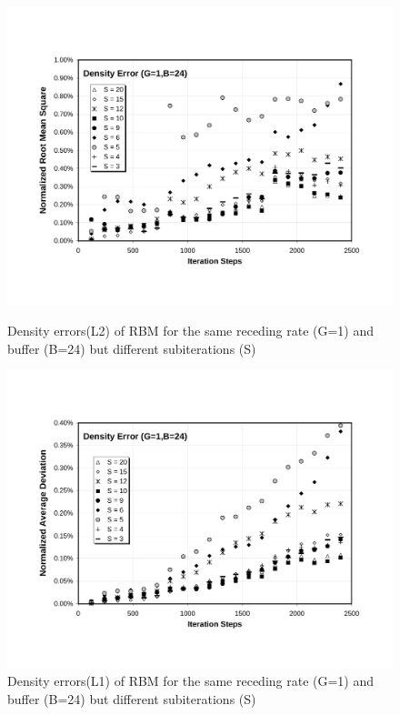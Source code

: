 \cp

\begin{figure}[htbp]
  \begin{center}
\includegraphics[scale=0.6]{../figures/Exp3-CASE1-dt0.005/G_1_B_24/G1-B24-Den-NRMS.pdf}
    \caption{Density errors(L2) of RBM for the same receding rate (G=1) and buffer (B=24) but different subiterations (S)}
        \vspace{0.5in}
\includegraphics[scale=0.6]{../figures/Exp3-CASE1-dt0.005/G_1_B_24/G1-B24-Den-NAD.pdf}
    \caption{Density errors(L1) of RBM for the same receding rate (G=1) and buffer (B=24) but different subiterations (S)}
  \end{center}
\end{figure}

